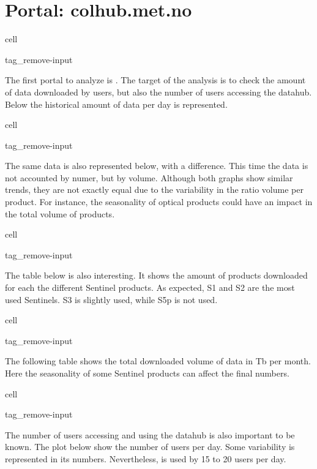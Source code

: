 \documentclass[letterpaper,10pt,english]{jupyterBook}
\begin{document}
\section{Portal: colhub.met.no}
\label{\detokenize{user_downloads:portal-colhub-met-no}}
\begin{sphinxuseclass}{cell}
\begin{sphinxuseclass}{tag_remove-input}
\end{sphinxuseclass}
\end{sphinxuseclass}
\sphinxAtStartPar
The first portal to analyze is . The target of the analysis is to check the amount of data downloaded by users, but also the number of users accessing the datahub. Below the historical amount of data per day is represented.

\begin{sphinxuseclass}{cell}
\begin{sphinxuseclass}{tag_remove-input}
\end{sphinxuseclass}
\end{sphinxuseclass}
\sphinxAtStartPar
The same data is also represented below, with a difference. This time the data is not accounted by numer, but by volume. Although both graphs show similar trends, they are not exactly equal due to the variability in the ratio volume per product. For instance, the seasonality of optical products could have an impact in the total volume of products.

\begin{sphinxuseclass}{cell}
\begin{sphinxuseclass}{tag_remove-input}
\end{sphinxuseclass}
\end{sphinxuseclass}
\sphinxAtStartPar
The table below is also interesting. It shows the amount of products downloaded for each the different Sentinel products. As expected, S1 and S2 are the most used Sentinels. S3 is slightly used, while S5p is not used.

\begin{sphinxuseclass}{cell}
\begin{sphinxuseclass}{tag_remove-input}
\end{sphinxuseclass}
\end{sphinxuseclass}
\sphinxAtStartPar
The following table shows the total downloaded volume of data in Tb per month. Here the seasonality of some Sentinel products can affect the final numbers.

\begin{sphinxuseclass}{cell}
\begin{sphinxuseclass}{tag_remove-input}
\end{sphinxuseclass}
\end{sphinxuseclass}
\sphinxAtStartPar
The number of users accessing and using the datahub is also important to be known. The plot below show the number of users per day. Some variability is represented in its numbers. Nevertheless,  is used by 15 to 20 users per day.
\end{document}
